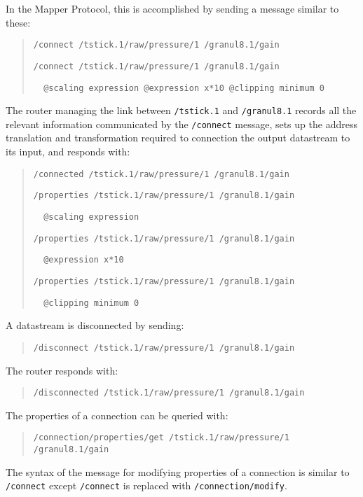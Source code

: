 In the Mapper Protocol, this is accomplished by sending a message similar to these:

\begin{quote}
\verb#/connect /tstick.1/raw/pressure/1 /granul8.1/gain#

\verb#/connect /tstick.1/raw/pressure/1 /granul8.1/gain#

\verb#  @scaling expression @expression x*10 @clipping minimum 0#
\end{quote}

The router managing the link between \verb#/tstick.1# and \verb#/granul8.1# records all the relevant information communicated by the \verb#/connect# message, sets up the address translation and transformation required to connection the output datastream to its input, and responds with:

\begin{quote}
\verb#/connected /tstick.1/raw/pressure/1 /granul8.1/gain#

\verb#/properties /tstick.1/raw/pressure/1 /granul8.1/gain#

\verb#  @scaling expression#

\verb#/properties /tstick.1/raw/pressure/1 /granul8.1/gain#

\verb#  @expression x*10#

\verb#/properties /tstick.1/raw/pressure/1 /granul8.1/gain#

\verb#  @clipping minimum 0#
\end{quote}

A datastream is disconnected by sending:

\begin{quote}
\verb#/disconnect /tstick.1/raw/pressure/1 /granul8.1/gain#
\end{quote}

The router responds with:

\begin{quote}
\verb#/disconnected /tstick.1/raw/pressure/1 /granul8.1/gain#
\end{quote}

The properties of a connection can be queried with:

\begin{quote}
\verb#/connection/properties/get /tstick.1/raw/pressure/1 /granul8.1/gain#
\end{quote}

The syntax of the message for modifying properties of a connection is similar to \verb#/connect# except \verb#/connect# is replaced with \verb#/connection/modify#.

